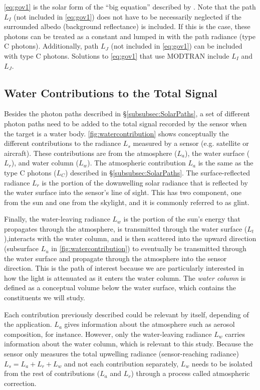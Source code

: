 \autoref{eq:gov1} is the solar form of the ``big equation'' described by \citet{Schott}. Note that the path $L_I$ (not included in \autoref{eq:gov1}) does not have to be necessarily neglected if the surrounded albedo (background reflectance) is included. If this is the case, these photons can be treated as a constant and lumped in with the path radiance (type C photons). Additionally, path $L_J$ (not included in \autoref{eq:gov1}) can be included with type C photons. Solutions to \autoref{eq:gov1} that use MODTRAN include $L_I$ and $L_J$.

\subsection{Water Contributions to the Total Signal}
Besides the photon paths described in \S\ref{subsubsec:SolarPaths}, a set of different photon paths need to be added to the total signal recorded by the sensor when the target is a water body. \autoref{fig:watercontribution} shows conceptually the different contributions to the radiance $L_s$ measured by a sensor (e.g. satellite or aircraft). These contributions are from the atmosphere ($L_a$), the water surface ($L_r$), and water column ($L_w$). The atmospheric contribution $L_a$ is the same as the type C photons ($L_C$) described in \S\ref{subsubsec:SolarPaths}. The surface-reflected radiance $L_r$ is the portion of the downwelling solar radiance that is reflected by the water surface into the sensor's line of sight. This has two component, one from the sun and one from the skylight, and it is commonly referred to as glint. 

Finally, the water-leaving radiance $L_w$ is the portion of the sun's energy that propagates through the atmosphere, is transmitted through the water surface ($L_t$),interacts with the water column, and is then scattered into the upward direction (subsurface $L_u$ in \autoref{fig:watercontribution}) to eventually be transmitted through the water surface and propagate through the atmosphere into the sensor direction. This is the path of interest because we are particularly interested in how the light is attenuated as it enters the water column. The {\it water column} is defined as a conceptual volume below the water surface, which contains the constituents we will study.

Each contribution previously described could be relevant by itself, depending of the application. $L_a$ gives information about the atmosphere such as aerosol composition, for instance. However, only the water-leaving radiance $L_w$ carries information about the water column, which is relevant to this study. Because the sensor only measures the total upwelling radiance (sensor-reaching radiance) $L_s=L_a+L_r+L_w$ and not each contribution separately, $L_w$ needs to be isolated from the rest of contributions ($L_a$ and $L_r$) through a process called atmospheric correction. 

